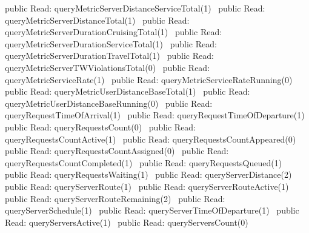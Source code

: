 public \LA{}Read: queryMetricServerDistanceServiceTotal(1)~{\nwtagstyle{}}\RA{}
public \LA{}Read: queryMetricServerDistanceTotal(1)~{\nwtagstyle{}}\RA{}
public \LA{}Read: queryMetricServerDurationCruisingTotal(1)~{\nwtagstyle{}}\RA{}
public \LA{}Read: queryMetricServerDurationServiceTotal(1)~{\nwtagstyle{}}\RA{}
public \LA{}Read: queryMetricServerDurationTravelTotal(1)~{\nwtagstyle{}}\RA{}
public \LA{}Read: queryMetricServerTWViolationsTotal(0)~{\nwtagstyle{}}\RA{}
public \LA{}Read: queryMetricServiceRate(1)~{\nwtagstyle{}}\RA{}
public \LA{}Read: queryMetricServiceRateRunning(0)~{\nwtagstyle{}}\RA{}
public \LA{}Read: queryMetricUserDistanceBaseTotal(1)~{\nwtagstyle{}}\RA{}
public \LA{}Read: queryMetricUserDistanceBaseRunning(0)~{\nwtagstyle{}}\RA{}
public \LA{}Read: queryRequestTimeOfArrival(1)~{\nwtagstyle{}}\RA{}
public \LA{}Read: queryRequestTimeOfDeparture(1)~{\nwtagstyle{}}\RA{}
public \LA{}Read: queryRequestsCount(0)~{\nwtagstyle{}}\RA{}
public \LA{}Read: queryRequestsCountActive(1)~{\nwtagstyle{}}\RA{}
public \LA{}Read: queryRequestsCountAppeared(0)~{\nwtagstyle{}}\RA{}
public \LA{}Read: queryRequestsCountAssigned(0)~{\nwtagstyle{}}\RA{}
public \LA{}Read: queryRequestsCountCompleted(1)~{\nwtagstyle{}}\RA{}
public \LA{}Read: queryRequestsQueued(1)~{\nwtagstyle{}}\RA{}
public \LA{}Read: queryRequestsWaiting(1)~{\nwtagstyle{}}\RA{}
public \LA{}Read: queryServerDistance(2)~{\nwtagstyle{}}\RA{}
public \LA{}Read: queryServerRoute(1)~{\nwtagstyle{}}\RA{}
public \LA{}Read: queryServerRouteActive(1)~{\nwtagstyle{}}\RA{}
public \LA{}Read: queryServerRouteRemaining(2)~{\nwtagstyle{}}\RA{}
public \LA{}Read: queryServerSchedule(1)~{\nwtagstyle{}}\RA{}
public \LA{}Read: queryServerTimeOfDeparture(1)~{\nwtagstyle{}}\RA{}
public \LA{}Read: queryServersActive(1)~{\nwtagstyle{}}\RA{}
public \LA{}Read: queryServersCount(0)~{\nwtagstyle{}}\RA{}
